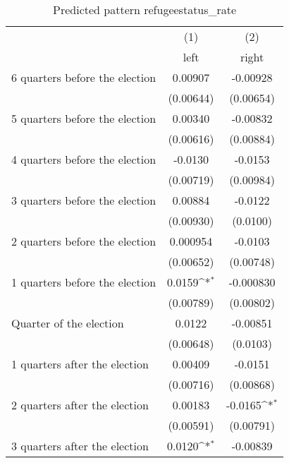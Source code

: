 \begin{table}[htbp]\centering
\def\sym#1{\ifmmode^{#1}\else\(^{#1}\)\fi}
\caption{Predicted pattern refugeestatus\_rate}
\begin{tabular}{l*{2}{c}}
\hline\hline
                    &\multicolumn{1}{c}{(1)}&\multicolumn{1}{c}{(2)}\\
                    &\multicolumn{1}{c}{left}&\multicolumn{1}{c}{right}\\
\hline
 6 quarters before the election&     0.00907         &    -0.00928         \\
                    &   (0.00644)         &   (0.00654)         \\
[1em]
 5 quarters before the election&     0.00340         &    -0.00832         \\
                    &   (0.00616)         &   (0.00884)         \\
[1em]
 4 quarters before the election&     -0.0130         &     -0.0153         \\
                    &   (0.00719)         &   (0.00984)         \\
[1em]
 3 quarters before the election&     0.00884         &     -0.0122         \\
                    &   (0.00930)         &    (0.0100)         \\
[1em]
 2 quarters before the election&    0.000954         &     -0.0103         \\
                    &   (0.00652)         &   (0.00748)         \\
[1em]
 1 quarters before the election&      0.0159\sym{*}  &   -0.000830         \\
                    &   (0.00789)         &   (0.00802)         \\
[1em]
Quarter of the election&      0.0122         &    -0.00851         \\
                    &   (0.00648)         &    (0.0103)         \\
[1em]
 1 quarters after the election&     0.00409         &     -0.0151         \\
                    &   (0.00716)         &   (0.00868)         \\
[1em]
 2 quarters after the election&     0.00183         &     -0.0165\sym{*}  \\
                    &   (0.00591)         &   (0.00791)         \\
[1em]
 3 quarters after the election&      0.0120\sym{*}  &    -0.00839         \\

\end{tabular}
\end{table}
